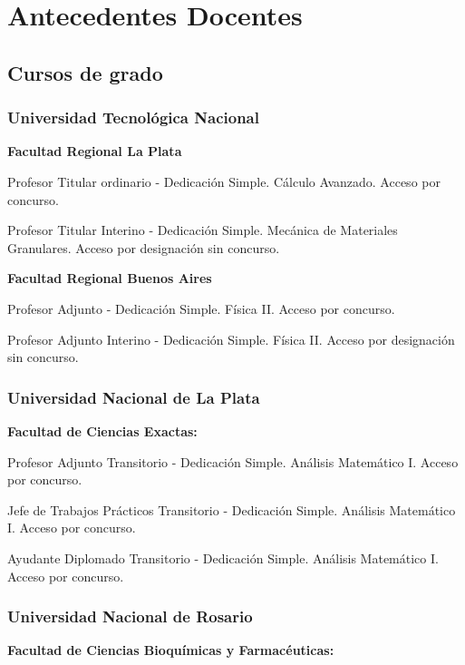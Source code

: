 \section{Antecedentes Docentes}

\subsection{Cursos de grado}

\subsubsection{Universidad Tecnológica Nacional}

\textbf{Facultad Regional La Plata}

 Profesor Titular ordinario - Dedicación Simple. Cálculo Avanzado. Acceso por concurso.

 Profesor Titular Interino - Dedicación Simple. Mecánica de Materiales Granulares. Acceso por designación sin concurso.

\textbf{Facultad Regional Buenos Aires}

 Profesor Adjunto - Dedicación Simple. Física II. Acceso por concurso.

 Profesor Adjunto Interino - Dedicación Simple. Física II. Acceso por designación sin concurso.

\subsubsection{Universidad Nacional de La Plata}
  
\textbf{Facultad de Ciencias Exactas:}
 
 Profesor Adjunto Transitorio - Dedicación Simple. Análisis Matemático I. Acceso por concurso.

 Jefe de Trabajos Prácticos Transitorio - Dedicación Simple. Análisis Matemático I. Acceso por concurso.

 Ayudante Diplomado Transitorio - Dedicación Simple. Análisis Matemático I. Acceso por concurso.
\newpage %
\subsubsection{Universidad Nacional de Rosario}
  
\textbf{Facultad de Ciencias Bioquímicas y Farmacéuticas:} 

